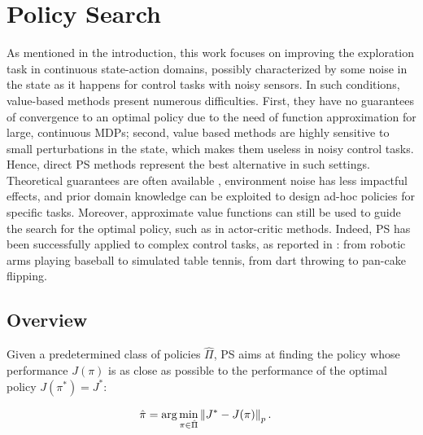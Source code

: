 \section{Policy Search}
As mentioned in the introduction, this work focuses on improving the exploration task in continuous state-action domains, possibly characterized by some noise in the state as it happens for control tasks with noisy sensors. In such conditions, value-based methods present numerous difficulties. First, they have no guarantees of convergence to an optimal policy due to the need of function approximation for large, continuous \gls{MDP}s; second, value based methods are highly sensitive to small perturbations in the state, which makes them useless in noisy control tasks. Hence, direct \gls{PS} methods represent the best alternative in such settings. Theoretical guarantees are often available \cite{more1994line}, environment noise has less impactful effects, and prior domain knowledge can be exploited to design ad-hoc policies for specific tasks. Moreover, approximate value functions can still be used to guide the search for the optimal policy, such as in actor-critic methods. Indeed, \gls{PS} has been successfully applied to complex control tasks, as reported in \cite{deisenroth2013survey}: from robotic arms playing baseball to simulated table tennis, from dart throwing to pan-cake flipping. 

\subsection{Overview} \label{subsec:PSoverview}
Given a predetermined class of policies $\hat{\Pi}$, \gls{PS} aims at finding the policy whose performance $J(\pi)$ is as close as possible to the performance of the optimal policy $J(\pi^*)=J^*$:

\begin{align}
\hat{\pi} &= \arg \min_{\pi\in\hat{\Pi}}\norm[p]{J^*-J(\pi)}. \label{eq:PSproblem}
\end{align}

